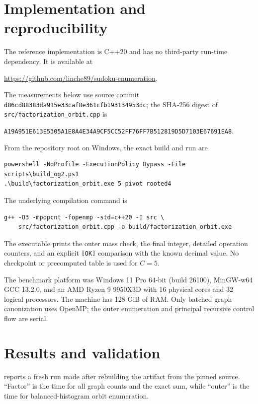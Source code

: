 \documentclass[11pt]{article}
\theoremstyle{definition}
\theoremstyle{remark}
\newcommand{\artifacturl}{https://github.com/linche89/sudoku-enumeration}
\begin{document}
\section{Implementation and reproducibility}
\label{sec:repro}

The reference implementation is C++20 and has no third-party run-time
dependency.  It is available at
\begin{center}
  \url{\artifacturl}.
\end{center}
The measurements below use source commit
\texttt{d86cd88383da915e33caf8e361cfb193134953dc}; the SHA-256 digest of
\texttt{src/factorization\_orbit.cpp} is
\begin{center}
\texttt{A19A951E613E5305A1E8A4E34A9CF5CC52FF76FF7B512819D5D7103E67691EA8}.
\end{center}
From the repository root on Windows, the exact build and run are
\begin{verbatim}
powershell -NoProfile -ExecutionPolicy Bypass -File scripts\build_og2.ps1
.\build\factorization_orbit.exe 5 pivot rooted4
\end{verbatim}
The underlying compilation command is
\begin{verbatim}
g++ -O3 -mpopcnt -fopenmp -std=c++20 -I src \
    src/factorization_orbit.cpp -o build/factorization_orbit.exe
\end{verbatim}
The executable prints the outer mass check, the final integer, detailed
operation counters, and an explicit \texttt{[OK]} comparison with the known
decimal value.  No checkpoint or precomputed table is used for $C=5$.

The benchmark platform was Windows 11 Pro 64-bit (build 26100), MinGW-w64 GCC
13.2.0, and an AMD Ryzen 9 9950X3D with 16 physical cores and 32 logical
processors.  The machine has 128 GiB of RAM.  Only batched graph canonization
uses OpenMP; the outer enumeration and principal recursive control flow are
serial.

\section{Results and validation}
\label{sec:results}

 reports a fresh run made after rebuilding the artifact from
the pinned source.  ``Factor'' is the time for all graph counts and the exact
sum, while ``outer'' is the time for balanced-histogram orbit enumeration.
\end{document}
